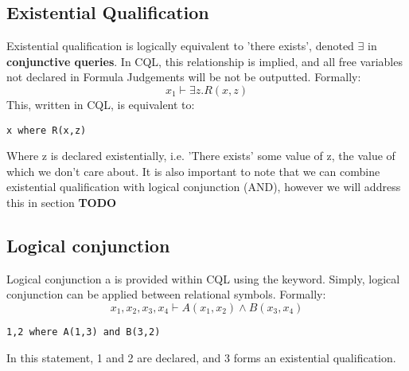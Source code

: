 \subsection{Existential Qualification}
Existential qualification is logically equivalent to 'there exists', denoted $\exists$ in \textbf{conjunctive queries}. In CQL, this relationship is implied, and all free variables not declared in Formula Judgements will be not be outputted. Formally:
$$ x_1 \vdash \exists z.R(x,z) $$
This, written in CQL, is equivalent to:
\begin{lstlisting}[style=framed]
x where R(x,z)
\end{lstlisting}
Where z is declared existentially, i.e. 'There exists' some value of z, the value of which we don't care about. It is also important to note that we can combine existential qualification with logical conjunction (AND), however we will address this in section \textbf{TODO}


\subsection{Logical conjunction}
Logical conjunction a is provided within CQL using the  keyword. Simply, logical conjunction can be applied between relational symbols. Formally:
$$x_1, x_2, x_3, x_4 \vdash A(x_1, x_2)  \land B(x_3, x_4)$$

\begin{lstlisting}
1,2 where A(1,3) and B(3,2)
\end{lstlisting}

In this statement, 1 and 2 are declared, and 3 forms an existential qualification.

